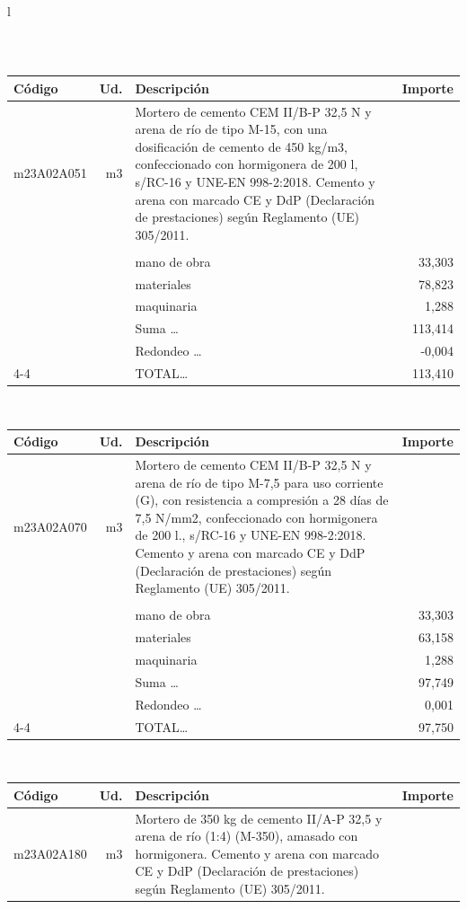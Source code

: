 \documentclass{book}%
\begin{document}
\begin{longtable}{l}
\begin{tabular}{l r p{60mm} r}
\end{tabular}\\%
\begin{tabular}{l r p{60mm} r}%
Código&Ud.&Descripción&Importe\\%
\hline%
m23A02A051&m3&Mortero de cemento CEM II/B{-}P 32,5 N y arena de río de tipo M{-}15, con una dosificación de cemento de 450 kg/m3, confeccionado con hormigonera de 200 l, s/RC{-}16 y UNE{-}EN 998{-}2:2018. Cemento y arena con marcado CE y DdP (Declaración de prestaciones) según Reglamento (UE) 305/2011.&\\%
&&&\\%
&&mano de obra&    33,303\\%
&&materiales&    78,823\\%
&&maquinaria&     1,288\\%
&&Suma \ldots&   113,414\\%
&&Redondeo \ldots&    {-}0,004\\%
\cline{4-4}%
&&TOTAL\ldots&   113,410\\%
\end{tabular}\\%
\begin{tabular}{l r p{60mm} r}%
Código&Ud.&Descripción&Importe\\%
\hline%
m23A02A070&m3&Mortero de cemento CEM II/B{-}P 32,5 N y arena de río de tipo M{-}7,5 para uso corriente (G), con resistencia a compresión a 28 días de 7,5 N/mm2, confeccionado con hormigonera de 200 l., s/RC{-}16 y UNE{-}EN 998{-}2:2018. Cemento y arena con marcado CE y DdP (Declaración de prestaciones) según Reglamento (UE) 305/2011.&\\%
&&&\\%
&&mano de obra&    33,303\\%
&&materiales&    63,158\\%
&&maquinaria&     1,288\\%
&&Suma \ldots&    97,749\\%
&&Redondeo \ldots&     0,001\\%
\cline{4-4}%
&&TOTAL\ldots&    97,750\\%
\end{tabular}\\%
\begin{tabular}{l r p{60mm} r}%
Código&Ud.&Descripción&Importe\\%
\hline%
m23A02A180&m3&Mortero de 350 kg de cemento II/A{-}P 32,5 y arena de río (1:4) (M{-}350), amasado con hormigonera. Cemento y arena con marcado CE y DdP (Declaración de prestaciones) según Reglamento (UE) 305/2011.&\\%

\end{tabular}
\end{longtable}
\end{document}
